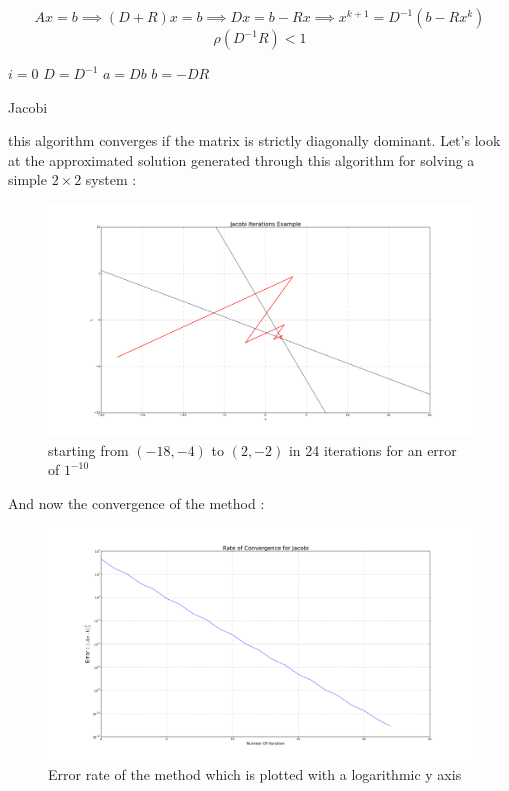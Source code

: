 \documentclass[a4paper]{report}
\begin{document}
\[
Ax=b \implies (D+R)x=b \implies Dx=b-Rx \implies x^{k+1}=D^{-1}(b-Rx^k)
\]
\[
\rho(D^{-1}R)<1
\]
\begin{algorithm}[H]
 $i=0$\;
 $D=D^{-1}$\;
 $a=Db$\;
 $b=-DR$\;
 \caption{Jacobi}
\end{algorithm}

this algorithm converges if the matrix is strictly diagonally dominant.
Let's look at the approximated solution generated through this algorithm for solving a simple $2 \times 2 $ system :
\begin{figure}[H]
\begin{center}
\includegraphics[scale=0.20]{jacobi_example.png}\caption{starting from $(-18,-4)$ to $(2,-2)$ in 24 iterations for an error of $1^{-10}$}
\end{center}
\end{figure}

And now the convergence of the method :
\begin{figure}[H]
\begin{center}
\includegraphics[scale=0.20]{jacobi_error.png}\caption{Error rate of the method which is plotted with a logarithmic y axis}
\end{center}
\end{figure}
\end{document}
